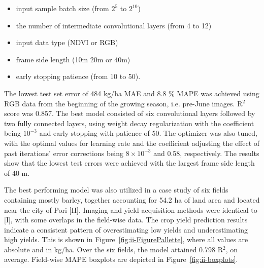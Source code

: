 \begin{itemize}
    \item input sample batch size (from $2^5$ to $2^{10}$)
    \item the number of intermediate convolutional layers (from 4 to 12)
    \item input data type (NDVI or RGB)
    \item frame side length (10m 20m or 40m)
    \item early stopping patience (from 10 to 50).
\end{itemize}

The lowest test set error of 484 kg/ha MAE and 8.8 \% MAPE was achieved using RGB data from the beginning of the growing season, i.e. pre-June images. R$^2$ score was 0.857. The best model consisted of six convolutional layers followed by two fully connected layers, using weight decay regularization with the coefficient being $10^{-3}$ and early stopping with patience of 50. The optimizer was also tuned, with the optimal values for learning rate and the coefficient adjusting the effect of past iterations' error corrections being $8 \times 10^{-3}$ and 0.58, respectively. The results show that the lowest test errors were achieved with the largest frame side length of 40 m. 

The best performing model was also utilized in a case study of six fields containing mostly barley, together accounting for 54.2 ha of land area and located near the city of Pori [II]. Imaging and yield acquisition methods were identical to [I], with some overlaps in the field-wise data. The crop yield prediction results indicate a consistent pattern of overestimating low yields and underestimating high yields. This is shown in Figure~\ref{fig:ii-FigurePallette}, where all values are absolute and in kg/ha. Over the six fields, the model attained 0.798 R$^2$, on average. Field-wise MAPE boxplots are depicted in Figure~\ref{fig:ii-boxplots}. 

